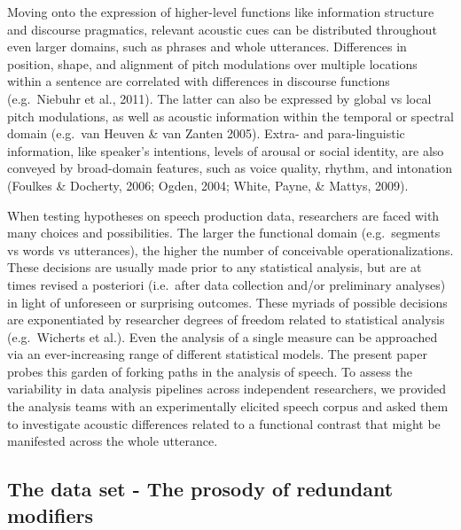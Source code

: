 \documentclass[
  english,
  man]{apa6}
\begin{document}
Moving onto the expression of higher-level functions like information structure and discourse pragmatics, relevant acoustic cues can be distributed throughout even larger domains, such as phrases and whole utterances.
Differences in position, shape, and alignment of pitch modulations over multiple locations within a sentence are correlated with differences in discourse functions (e.g.~Niebuhr et al., 2011).
The latter can also be expressed by global vs local pitch modulations, as well as acoustic information within the temporal or spectral domain (e.g.~van Heuven \& van Zanten 2005).
Extra- and para-linguistic information, like speaker's intentions, levels of arousal or social identity, are also conveyed by broad-domain features, such as voice quality, rhythm, and intonation (Foulkes \& Docherty, 2006; Ogden, 2004; White, Payne, \& Mattys, 2009).

When testing hypotheses on speech production data, researchers are faced with many choices and possibilities.
The larger the functional domain (e.g.~segments vs words vs utterances), the higher the number of conceivable operationalizations.
These decisions are usually made prior to any statistical analysis, but are at times revised a posteriori (i.e.~after data collection and/or preliminary analyses) in light of unforeseen or surprising outcomes.
These myriads of possible decisions are exponentiated by researcher degrees of freedom related to statistical analysis (e.g.~Wicherts et al.).
Even the analysis of a single measure can be approached via an ever-increasing range of different statistical models.
The present paper probes this garden of forking paths in the analysis of speech.
To assess the variability in data analysis pipelines across independent researchers, we provided the analysis teams with an experimentally elicited speech corpus and asked them to investigate acoustic differences related to a functional contrast that might be manifested across the whole utterance.

\hypertarget{the-data-set---the-prosody-of-redundant-modifiers}{%
\subsection{The data set - The prosody of redundant modifiers}\label{the-data-set---the-prosody-of-redundant-modifiers}}
\end{document}
